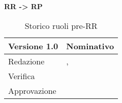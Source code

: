 \textbf{RR -> RP}
\label{tabVers2}
\begin{table}[h]
	\begin{tabular}{p{} p{}}
		\toprule \textbf{Versione 1.0}	&	\textbf{Nominativo}\\
		\midrule Redazione	& \PM, \BM \\
		\midrule Verifica &	\PT\\
		\midrule Approvazione	& \VG \\
		\bottomrule
	\end{tabular}
	\caption{Storico ruoli pre-RR}
\end{table}